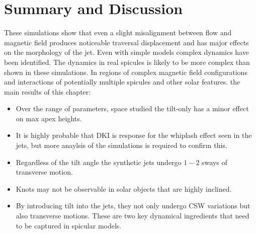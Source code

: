 \documentclass[12pt]{ociamthesis}
\begin{document}
\section{Summary and Discussion}
\label{sec:sum}
These simulations show that even a slight misalignment between flow and magnetic field produces noticeable traversal displacement and has major effects on the morphology of the jet. Even with simple models complex dynamics have been identified. The dynamics in real spicules is likely to be more complex than shown in these simulations. In regions of complex  magnetic field configurations and interactions of potentially multiple spicules and other solar features. the main results of this chapter: 
\begin{itemize}
\item Over the range of parameters, space studied the tilt-only has a minor effect on max apex heights.
\item It is highly probable that DKI is response for the whiplash effect seen in the jets, but more anaylsis of the simulations is required to confirm this.
\item Regardless of the tilt angle the synthetic jets undergo $1-2$ sways of transverse motion.
\item Knots may not be observable in solar objects that are highly inclined.
\item By introducing tilt into the jets, they not only undergo CSW variations but also transverse motions. These are two key dynamical ingredients that need to be captured in spicular models.
\end{itemize}




  
\end{document}
